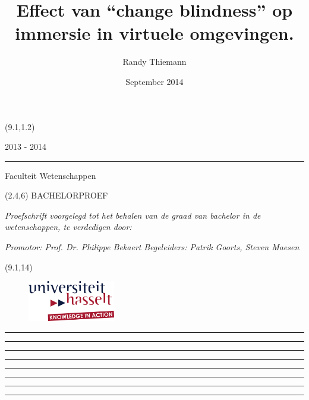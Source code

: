 \documentclass[a4paper,12pt]{report}
\title{Effect van ``change blindness'' op immersie in virtuele omgevingen.}  \let\Title\@title
\author{Randy Thiemann}                        \let\Author\@author
\date{September 2014}
\begin{document}
\thispagestyle{empty}
\begin{textblock}{7}(9.1,1.2)
    {\color{uhasselttext} 2013 - 2014 \rule{0.2mm}{2.1mm} }{\color{uhasseltblue} Faculteit Wetenschappen}
\end{textblock}
\begin{textblock}{6.5}(2.4,6)
    \vspace*{1.5cm}
    {\Large\noindent\color{uhasselttext} BACHELORPROEF}\newline
    \vspace{1.5cm}

    {\noindent\LARGE\bf\color{uhasseltblue} \Title}\newline
    \vspace{1.7cm}
    
    {\small\color{uhasselttext}\noindent\it Proefschrift voorgelegd tot het behalen van de graad van bachelor in de wetenschappen, te verdedigen door:}\newline

    {\noindent\color{uhasselttext}\bf \Author}\newline
    
    {\small\noindent\color{uhasselttext}\it Promotor: Prof. Dr. Philippe Bekaert}\newline
    {\small\noindent\color{uhasselttext}\it Begeleiders: Patrik Goorts, Steven Maesen}
    \vspace{1.5cm}
\end{textblock}
\begin{textblock}{6.5}(9.1,14)
    \begin{figure}[ht]
        \centering
        \includegraphics[width=1.5in]{logo_uhasselt}
    \end{figure}
\end{textblock}
\hspace*{4cm}
{\color{uhasseltred}\rule{0.4mm}{\paperheight}}
\hspace{0.28cm}
{\color{uhasseltred}\rule{0.4mm}{\paperheight}}
\hspace{0.015cm}
{\color{uhasseltred}\rule{0.4mm}{\paperheight}}
\hspace{0.015cm}
{\color{uhasseltred}\rule{0.4mm}{\paperheight}}
\hspace{0.52525cm}
{\color{uhasseltred}\rule{0.4mm}{\paperheight}}
\hspace{0.30cm}
{\color{uhasseltred}\rule{0.4mm}{\paperheight}}
\hspace{0.36cm}
{\color{uhasseltred}\rule{0.4mm}{\paperheight}}
\hspace{0.015cm}
{\color{uhasseltred}\rule{0.4mm}{\paperheight}}
\newpage
\restoregeometry
\end{document}
